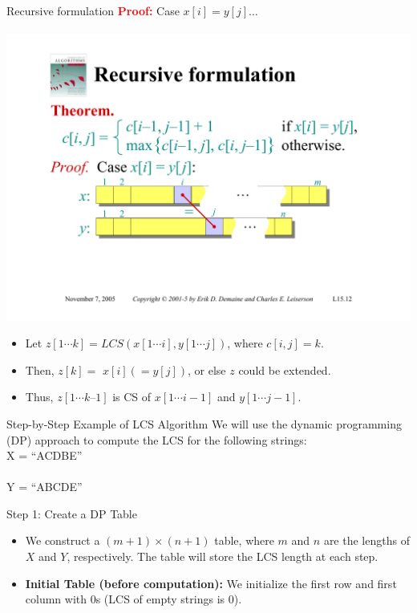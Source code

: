 \documentclass[aspectratio=169]{beamer}
\begin{document}
\begin{frame}{Recursive formulation}
    \textcolor{red}{\textbf{Proof:}} Case $x[i] = y[j] \ldots$ \\
    \\
    \includegraphics[width=\textwidth,trim=3cm 5cm 3cm 10.50cm, clip]{figures/proof01.pdf}
    \begin{itemize}
        \item Let $z[1 \cdots k] = LCS(x[1 \cdots i], y[1 \cdots j])$, where $c[i, j] = k$. \pause
        \item Then, $z[k] =$ \pause $x[i] ( = y[j])$\pause, or else $z$ could be extended. \pause
        \item Thus, $z[1 \cdots k–1]$ is CS of $x[1 \cdots i - 1]$ and $y[1 \cdots j - 1]$.
    \end{itemize}
\end{frame}

\begin{frame}{Step-by-Step Example of LCS Algorithm}
    We will use the dynamic programming (DP) approach to compute the LCS for the following strings:\\

    {\Huge X = ``ACDBE''} \\
    \\
    {\Huge Y = ``ABCDE''}
\end{frame}

\begin{frame}{Step 1: Create a DP Table}
    \begin{itemize}
        \item We construct a $(m+1) \times (n+1)$ table, where $m$ and $n$ are the lengths of $X$ and $Y$, respectively. The table will store the LCS length at each step.
        \item \textbf{Initial Table (before computation):} We initialize the first row and first column with 0s (LCS of empty strings is 0).
    \end{itemize}
\end{frame}
\end{document}
